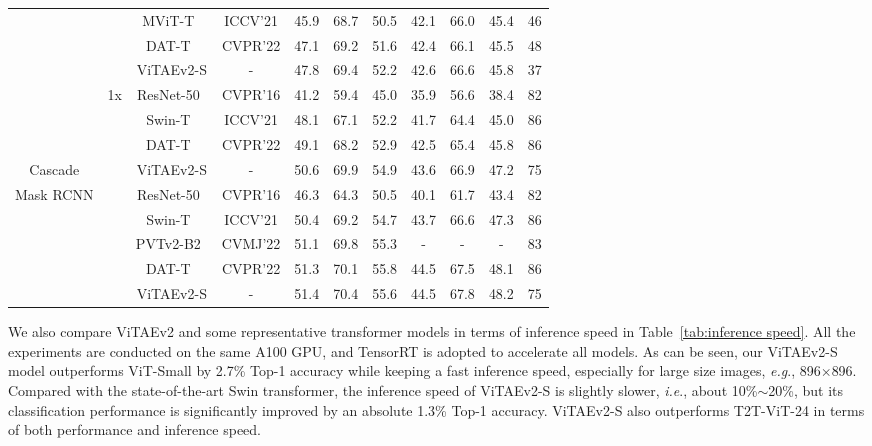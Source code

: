 \documentclass[twocolumn]{svjour3}          \smartqed  \usepackage{natbib}
\newcommand{\ie}{i.e}
\newcommand{\eg}{e.g}
\def\onedot{.\xspace}
\def\eg{\emph{e.g}\onedot}
\def\ie{\emph{i.e}\onedot}
\begin{document}
\begin{table*}[htbp]
{\begin{tabular}{c|c|c|c|ccc|ccc|c}
          &       & MViT-T~\citep{fan2021multiscale} & ICCV'21 & 45.9  & 68.7  & 50.5  & 42.1  & 66.0    & 45.4  & 46 \\
          &       & DAT-T~\citep{xia2022vision} & CVPR'22 & 47.1  & 69.2  & 51.6  & 42.4  & 66.1  & 45.5  & 48 \\
          &       & {ViTAEv2-S} & - & {47.8} & {69.4} & {52.2} & {42.6} & {66.6} & {45.8} & {37} \\
    \hline
          & \multirow{5}[2]{*}{1x} & ResNet-50~\citep{he2016deep} & CVPR'16 & 41.2  & 59.4  & 45.0    & 35.9  & 56.6  & 38.4  & 82 \\
          &       & Swin-T~\citep{liu2021swin} & ICCV'21 & 48.1  & 67.1  & 52.2  & 41.7  & 64.4  & 45.0    & 86 \\
          &       & DAT-T~\citep{xia2022vision} & CVPR'22 & 49.1  & 68.2  & 52.9  & 42.5  & 65.4  & 45.8  & 86 \\
    Cascade  &       & {ViTAEv2-S} & - & {50.6} & {69.9} & {54.9} & {43.6} & {66.9} & {47.2} & {75} \\
\cline{2-11}    Mask RCNN & \multirow{5}[2]{*}{3x} & ResNet-50~\citep{he2016deep} & CVPR'16 & 46.3  & 64.3  & 50.5  & 40.1  & 61.7  & 43.4  & 82 \\
    \citep{cai2019cascade}  &       & Swin-T~\citep{liu2021swin} & ICCV'21 & 50.4  & 69.2  & 54.7  & 43.7  & 66.6  & 47.3  & 86 \\
          &       & PVTv2-B2~\citep{wang2021pvtv2} & CVMJ'22 & 51.1  & 69.8  & 55.3  & - & - & - & 83 \\
          &       & DAT-T~\citep{xia2022vision} & CVPR'22 & 51.3  & 70.1  & 55.8  & 44.5  & 67.5  & 48.1  & 86 \\
          &       & {ViTAEv2-S} & - & {51.4} & {70.4} & {55.6} & {44.5} & {67.8} & {48.2} & {75} \\
    \hline
    \end{tabular}}\label{tab:detection results}\end{table*}


We also compare ViTAEv2 and some representative transformer models in terms of inference speed in Table~\ref{tab:inference speed}. All the experiments are conducted on the same A100 GPU, and TensorRT is adopted to accelerate all models. As can be seen, our ViTAEv2-S model outperforms ViT-Small by 2.7\% Top-1 accuracy while keeping a fast inference speed, especially for large size images, \eg, 896$\times$896. Compared with the state-of-the-art Swin transformer, the inference speed of ViTAEv2-S is slightly slower, \ie, about 10\%$\sim$20\%, but its classification performance is significantly improved by an absolute 1.3\% Top-1 accuracy. ViTAEv2-S also outperforms T2T-ViT-24 in terms of both performance and inference speed.
\end{document}
